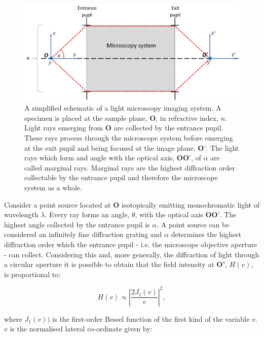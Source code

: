 \begin{figure}[h]
	\centering
	\includegraphics[width=\textwidth]{images/simplified_microscope_layout.jpg}
	\caption[A simplified schematic of a light microscopy imaging system.]{A simplified 
		schematic of a light microscopy imaging system. A specimen 
		is placed at the sample plane, $\textbf{O}$, in refractive index, $n$. Light 
		rays emerging from $\textbf{O}$ are collected by the entrance pupil. These 
		rays process through the microscope system before emerging at the exit pupil 
		and being focused at the image plane, $\textbf{O'}$. The light rays which 
		form and angle with the optical axis, $\textbf{OO'}$, of $\alpha$ are called
		marginal rays. Marginal rays are the highest diffraction order collectable by
		the entrance pupil and therefore the microscope system as a whole.}
	\label{fig:simplified_microscope_layout}
\end{figure}

Consider a point source located at $\textbf{O}$ isotopically emitting 
monochromatic light of wavelength $\lambda$. Every ray forms an angle, 
$\theta$, with the optical axis $\textbf{OO'}$. The highest angle collected
by the entrance pupil is $\alpha$. A point source can be considered an 
infinitely fine diffraction grating and $\alpha$ determines the highest 
diffraction order which the entrance pupil - i.e. the microscope
objective aperture - can collect\cite{davidson2002optical}. Considering this 
and, more generally, the diffraction of light through a circular aperture 
it is possible to obtain that the field intensity at \textbf{O'}, $H(v)$, is 
proportional to\cite{goodman2005introduction,born2013principles,antonello2014optimisation}:

\begin{equation}\label{eq:image_field_insentity}
H(v) \propto \left|\frac{2J_{1}(v)}{v}\right|^2,
\end{equation}

where $J_{1}(v))$ is the first-order Bessel function of the first kind of
the variable $v$\cite{watson1995treatise}. $v$ is the normalised lateral 
co-ordinate given by\cite{wilson1984theory}:


